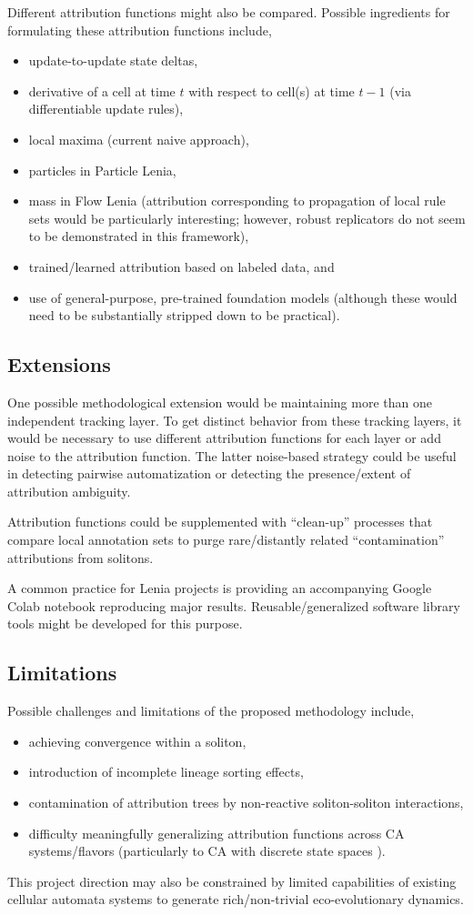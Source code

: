 Different attribution functions might also be compared.
Possible ingredients for formulating these attribution functions include,
\begin{itemize}
\item update-to-update state deltas,
\item derivative of a cell at time $t$ with respect to cell(s) at time $t-1$ (via differentiable update rules),
\item local maxima (current naive approach),
\item particles in Particle Lenia,
\item mass in Flow Lenia (attribution corresponding to propagation of local rule sets would be particularly interesting; however, robust replicators do not seem to be demonstrated in this framework),
\item trained/learned attribution based on labeled data, and
\item use of general-purpose, pre-trained foundation models (although these would need to be substantially stripped down to be practical).
\end{itemize}

\subsection{Extensions}

One possible methodological extension would be maintaining more than one independent tracking layer.
To get distinct behavior from these tracking layers, it would be necessary to use different attribution functions for each layer or add noise to the attribution function.
The latter noise-based strategy could be useful in detecting pairwise automatization or detecting the presence/extent of attribution ambiguity.

Attribution functions could be supplemented with ``clean-up'' processes that compare local annotation sets to purge rare/distantly related ``contamination'' attributions from solitons.

A common practice for Lenia projects is providing an accompanying Google Colab notebook reproducing major results.
Reusable/generalized software library tools might be developed for this purpose.

\subsection{Limitations}

Possible challenges and limitations of the proposed methodology include,
\begin{itemize}
\item achieving convergence within a soliton,
\item introduction of incomplete lineage sorting effects,
\item contamination of attribution trees by non-reactive soliton-soliton interactions,
\item difficulty meaningfully generalizing attribution functions across CA systems/flavors (particularly to CA with discrete state spaces \citep{miotti2025differentiable}).
\end{itemize}

This project direction may also be constrained by limited capabilities of existing cellular automata systems to generate rich/non-trivial eco-evolutionary dynamics.
